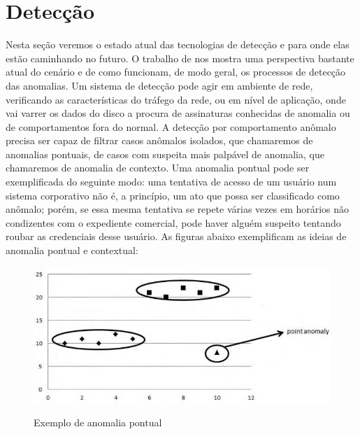 \section{Detecção}
\label{s.deteccao}

Nesta seção veremos o estado atual das tecnologias de
detecção e para onde elas estão caminhando no futuro. O trabalho de
\citeauthor{baddarxx} nos mostra uma perspectiva bastante atual do cenário e
de como funcionam, de modo geral, os processos de detecção das anomalias. Um
sistema de detecção pode agir em ambiente de rede, verificando as
características do tráfego da rede, ou em nível de aplicação, onde vai varrer
os dados do disco a procura de assinaturas conhecidas de anomalia ou de
comportamentos fora do normal. A detecção por comportamento anômalo precisa
ser capaz de filtrar casos anômalos isolados, que chamaremos de anomalias
pontuais, de casos com suspeita mais palpável de anomalia, que chamaremos de
anomalia de contexto. Uma anomalia pontual pode ser exemplificada do seguinte
modo: uma tentativa de acesso de um usuário num sistema corporativo não é, a
princípio, um ato que possa ser classificado como anômalo; porém, se essa
mesma tentativa se repete várias vezes em horários não condizentes com o
expediente comercial, pode haver alguém suspeito tentando roubar as
credenciais desse usuário. As figuras abaixo exemplificam as ideias de
anomalia pontual e contextual:

\begin{figure}[H]
\caption{\small Exemplo de anomalia pontual}
\centering
\includegraphics[scale=0.5]{figs/anomalia_pontual.JPG}
\label{f.anomalia_pontual}
\end{figure}

